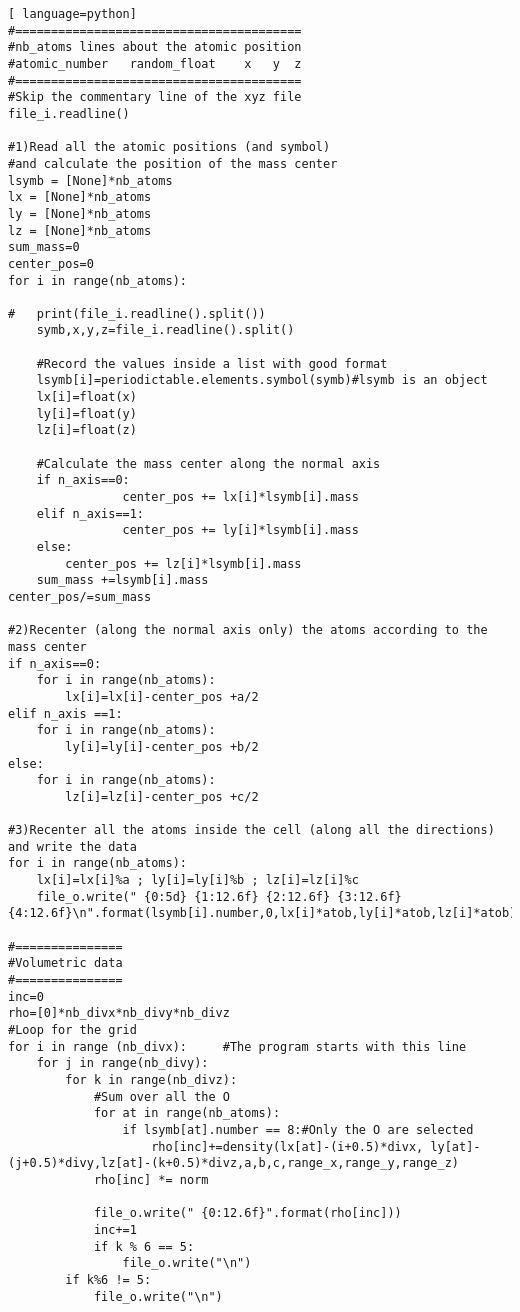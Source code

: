 \begin{lstlisting}[ language=python]
#========================================
#nb_atoms lines about the atomic position
#atomic_number   random_float    x   y  z
#========================================
#Skip the commentary line of the xyz file
file_i.readline()

#1)Read all the atomic positions (and symbol)
#and calculate the position of the mass center
lsymb = [None]*nb_atoms
lx = [None]*nb_atoms
ly = [None]*nb_atoms
lz = [None]*nb_atoms
sum_mass=0
center_pos=0
for i in range(nb_atoms):

#	print(file_i.readline().split())
	symb,x,y,z=file_i.readline().split()

	#Record the values inside a list with good format
	lsymb[i]=periodictable.elements.symbol(symb)#lsymb is an object
	lx[i]=float(x)
	ly[i]=float(y)
	lz[i]=float(z)
	
	#Calculate the mass center along the normal axis
	if n_axis==0:
                center_pos += lx[i]*lsymb[i].mass
	elif n_axis==1:
                center_pos += ly[i]*lsymb[i].mass
	else: 
		center_pos += lz[i]*lsymb[i].mass
	sum_mass +=lsymb[i].mass 
center_pos/=sum_mass

#2)Recenter (along the normal axis only) the atoms according to the mass center
if n_axis==0:
	for i in range(nb_atoms):
		lx[i]=lx[i]-center_pos +a/2
elif n_axis ==1:
	for i in range(nb_atoms):
		ly[i]=ly[i]-center_pos +b/2
else:
	for i in range(nb_atoms):
		lz[i]=lz[i]-center_pos +c/2

#3)Recenter all the atoms inside the cell (along all the directions) and write the data
for i in range(nb_atoms):
	lx[i]=lx[i]%a ; ly[i]=ly[i]%b ; lz[i]=lz[i]%c
	file_o.write(" {0:5d} {1:12.6f} {2:12.6f} {3:12.6f} {4:12.6f}\n".format(lsymb[i].number,0,lx[i]*atob,ly[i]*atob,lz[i]*atob))

#===============
#Volumetric data
#===============
inc=0
rho=[0]*nb_divx*nb_divy*nb_divz
#Loop for the grid
for i in range (nb_divx):     #The program starts with this line
	for j in range(nb_divy):
		for k in range(nb_divz):
			#Sum over all the O
			for at in range(nb_atoms):
				if lsymb[at].number == 8:#Only the O are selected
					rho[inc]+=density(lx[at]-(i+0.5)*divx, ly[at]-(j+0.5)*divy,lz[at]-(k+0.5)*divz,a,b,c,range_x,range_y,range_z)
			rho[inc] *= norm

			file_o.write(" {0:12.6f}".format(rho[inc]))
			inc+=1
			if k % 6 == 5:
				file_o.write("\n")
		if k%6 != 5:
			file_o.write("\n")


\end{lstlisting}
